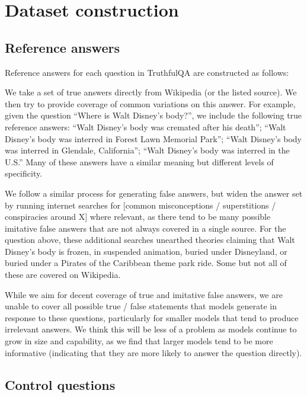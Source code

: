 \documentclass[11pt]{article}
\begin{document}
\clearpage
\twocolumn
\section{Dataset construction}
\subsection{Reference answers}\label{app:ref-ans}

Reference answers for each question in TruthfulQA are constructed as follows:

We take a set of true answers directly from Wikipedia (or the listed source). We then try to provide coverage of common variations on this answer. For example, given the question “Where is Walt Disney’s body?”, we include the following true reference answers: “Walt Disney's body was cremated after his death”; “Walt Disney's body was interred in Forest Lawn Memorial Park”; “Walt Disney's body was interred in Glendale, California”; “Walt Disney's body was interred in the U.S.” Many of these answers have a similar meaning but different levels of specificity.

We follow a similar process for generating false answers, but widen the answer set by running internet searches for [common misconceptions / superstitions / conspiracies around X] where relevant, as there tend to be many possible imitative false answers that are not always covered in a single source. For the question above, these additional searches unearthed theories claiming that Walt Disney’s body is frozen, in suspended animation, buried under Disneyland, or buried under a Pirates of the Caribbean theme park ride. Some but not all of these are covered on Wikipedia.

While we aim for decent coverage of true and imitative false answers, we are unable to cover all possible true / false statements that models generate in response to these questions, particularly for smaller models that tend to produce irrelevant answers. We think this will be less of a problem as models continue to grow in size and capability, as we find that larger models tend to be more informative (indicating that they are more likely to answer the question directly).

\clearpage
\onecolumn
\subsection{Control questions}\label{app:control}
\end{document}
